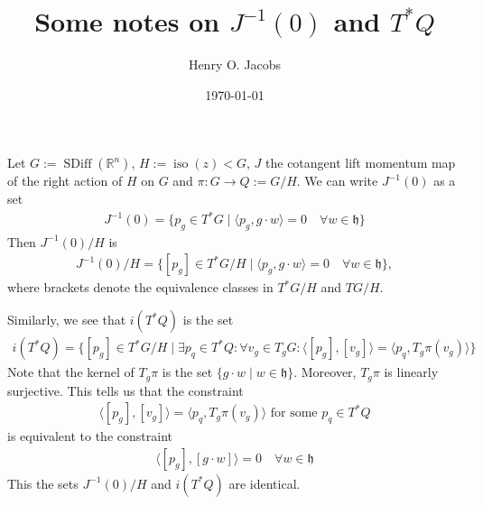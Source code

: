 \documentclass[12pt]{amsart}
\title{Some notes on $J^{-1}(0)$ and $T^*Q$}
\author{Henry O. Jacobs}
\date{\today}
\DeclareMathOperator{\SDiff}{SDiff}
\DeclareMathOperator{\iso}{iso}
\begin{document}
\maketitle

Let $G := \SDiff(\mathbb{R}^n)$, $H := \iso(z) < G$, $J$ the cotangent
lift momentum map of the right action of $H$ on $G$ and
$\pi\colon G \to Q := G/H$. We can write $J^{-1}(0)$ as a set
\begin{align*}
	J^{-1}(0) = \{ p_g \in T^*G \mid \langle p_g , g \cdot w \rangle = 0 \quad \forall w \in \mathfrak{h} \}
\end{align*}
Then $J^{-1}(0) / H$ is
\begin{align*}
	J^{-1}(0) / H = \{ [p_g] \in T^*G/H \mid  \langle p_g , g \cdot w \rangle = 0 \quad \forall w \in \mathfrak{h} \},
\end{align*}
where brackets denote the equivalence classes in $T^*G/H$ and $TG/H$.

Similarly, we see that $i(T^*Q)$ is the set
\begin{align*}
	i(T^*Q) = \{ [p_g] \in T^*G/H \mid \exists p_q \in T^*Q\colon \forall v_g \in T_g G\colon \langle [p_g] , [v_g] \rangle = \langle p_q , T_g\pi(v_g) \rangle \}
\end{align*}
Note that the kernel of $T_g\pi$ is the set $\{ g \cdot w \mid w \in \mathfrak{h}\}$.
Moreover, $T_g \pi$ is linearly surjective.
This tells us that the constraint
\begin{align*}
	\langle [p_g] , [v_g] \rangle = \langle p_q , T_g\pi(v_g) \rangle \text{ for some } p_q \in T^*Q
\end{align*}
is equivalent to the constraint
\begin{align*}
	\langle [p_g], [g \cdot w] \rangle = 0 \quad \forall w \in \mathfrak{h}
\end{align*}
This the sets $J^{-1}(0) / H $ and $i(T^*Q)$ are identical.




\end{document}
